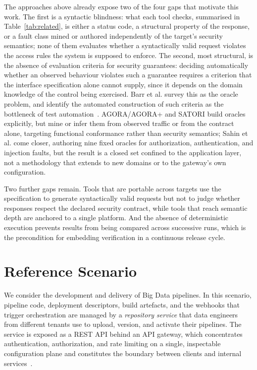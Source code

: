 \documentclass[
]{ceurart}
\begin{document}
The approaches above already expose two of the four gaps that motivate this work.
The first is a syntactic blindness: what each tool checks, summarised in Table~\ref{tab:related}, is either a status code, a structural property of the response, or a fault class mined or authored independently of the target's security semantics; none of them evaluates whether a syntactically valid request violates the access rules the system is supposed to enforce.
The second, most structural, is the absence of evaluation criteria for security guarantees: deciding automatically whether an observed behaviour violates such a guarantee requires a criterion that the interface specification alone cannot supply, since it depends on the domain knowledge of the control being exercised.
Barr et al. survey this as the oracle problem, and identify the automated construction of such criteria as the bottleneck of test automation~\cite{barrOracleProblemSoftware2015}. AGORA/AGORA+ and SATORI build oracles explicitly, but mine or infer them from observed traffic or from the contract alone, targeting functional conformance rather than security semantics; Sahin et al. come closer, authoring nine fixed oracles for authorization, authentication, and injection faults, but the result is a closed set confined to the application layer, not a methodology that extends to new domains or to the gateway's own configuration.

Two further gaps remain.
Tools that are portable across targets use the specification to generate syntactically valid requests but not to judge whether responses respect the declared security contract, while tools that reach semantic depth are anchored to a single platform.
And the absence of deterministic execution prevents results from being compared across successive runs, which is the precondition for embedding verification in a continuous release cycle.



\section{Reference Scenario}

We consider the development and delivery of Big Data pipelines.
In this scenario, pipeline code, deployment descriptors, build artefacts, and the webhooks that trigger orchestration are managed by a \emph{repository service} that data engineers from different tenants use to upload, version, and activate their pipelines.
The service is exposed as a REST API behind an API gateway, which concentrates authentication, authorization, and rate limiting on a single, inspectable configuration plane and constitutes the boundary between clients and internal services~\cite{roseZeroTrustArchitecture2020}.
\end{document}
